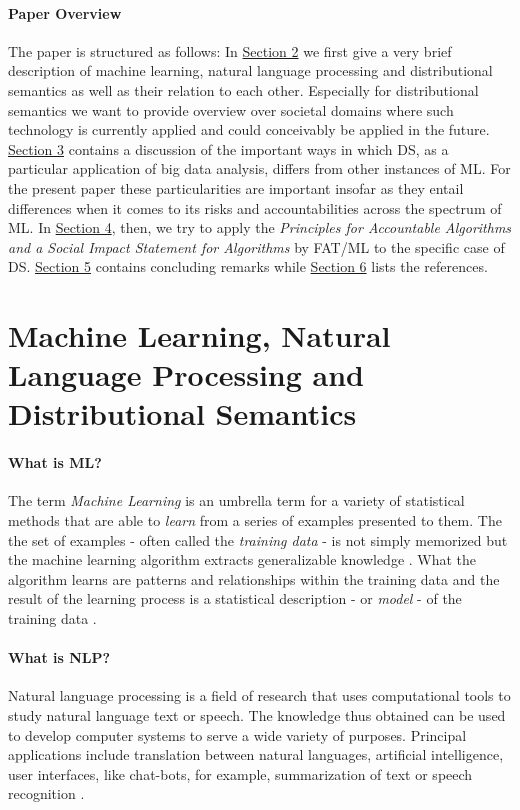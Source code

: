 \documentclass{article}
\begin{document}
\paragraph{Paper Overview}
The paper is structured as follows: In \hyperlink{sec2}{Section 2} we first give a very brief description of machine learning, natural language processing and distributional semantics as well as their relation to each other. Especially for distributional semantics we want to provide overview over societal domains where such technology is currently applied and could conceivably be applied in the future. \hyperlink{sec3}{Section 3} contains a discussion of the important ways in which DS, as a particular application of big data analysis, differs from other instances of ML. For the present paper these particularities are important insofar as they entail differences when it comes to its risks and accountabilities across the spectrum of ML. In \hyperlink{sec4}{Section 4}, then, we try to apply the \emph{Principles for Accountable Algorithms and a Social Impact Statement for Algorithms} by FAT/ML to the specific case of DS. \hyperlink{sec5}{Section 5} contains concluding remarks while \hyperlink{sec6}{Section 6} lists the references.
\section{Machine Learning, Natural Language Processing and Distributional Semantics}\hypertarget{sec3}{ }
\paragraph{What is ML?}
The term \emph{Machine Learning} is an umbrella term for a variety of statistical methods that are able to \emph{learn} from a series of examples presented to them. The the set of examples - often called the \emph{training data} - is not simply memorized but the machine learning algorithm extracts generalizable knowledge \cite{domingos2012few}.
 What the algorithm learns are patterns and relationships within the training data and the result of the learning process is a statistical description - or \emph{model} - of the training data \cite{fayyad2001digital}.
\paragraph{What is NLP?}
Natural language processing is a field of research that uses computational tools to study natural language text or speech. The knowledge thus obtained can be used to develop computer systems to serve a wide variety of purposes. Principal applications include translation between natural languages, artificial intelligence, user interfaces, like chat-bots, for example, summarization of text or speech recognition \cite{chowdhury2003natural}.
\end{document}
